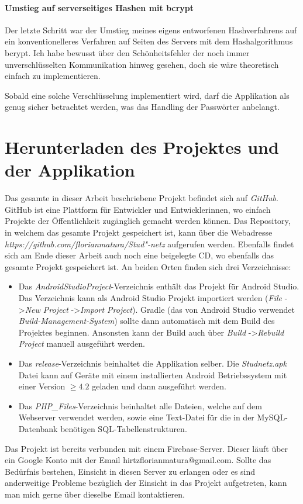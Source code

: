 \documentclass[../main.tex]{subfiles}
\begin{document}
	\paragraph{Umstieg auf serverseitiges Hashen mit bcrypt}
	Der letzte Schritt war der Umstieg meines eigens entworfenen Hashverfahrens auf ein konventionelleres Verfahren auf Seiten des Servers mit dem Hashalgorithmus bcrypt. Ich habe bewusst über den Schönheitsfehler der noch immer unverschlüsselten Kommunikation hinweg gesehen, doch sie wäre theoretisch einfach zu implementieren. 
	
	Sobald eine solche Verschlüsselung implementiert wird, darf die Applikation als genug sicher betrachtet werden, was das Handling der Passwörter anbelangt.
	
	\section{Herunterladen des Projektes und der Applikation} \label{github}

	Das gesamte in dieser Arbeit beschriebene Projekt befindet sich auf \emph{GitHub}. GitHub ist eine Plattform für Entwickler und Entwicklerinnen, wo einfach Projekte der Öffentlichkeit zugänglich gemacht werden können. Das Repository, in welchem das gesamte Projekt gespeichert ist, kann über die Webadresse \emph{https://github.com/florianmatura/Stud"-netz} aufgerufen werden. Ebenfalls findet sich am Ende dieser Arbeit auch noch eine beigelegte CD, wo ebenfalls das gesamte Projekt gespeichert ist. An beiden Orten finden sich drei Verzeichnisse:

	\begin{itemize}
		\item Das \emph{AndroidStudioProject}-Verzeichnis enthält das Projekt für Android Studio. Das Verzeichnis kann als Android Studio Projekt importiert werden (\emph{File} -\textgreater \emph{New Project} -\textgreater \emph{Import Project}). Gradle (das von Android Studio verwendet \emph{Build-Management-System}) sollte dann automatisch mit dem Build des Projektes beginnen. Ansonsten kann der Build auch über \emph{Build} -\textgreater \emph{Rebuild Project} manuell ausgeführt werden.
		\item Das \emph{release}-Verzeichnis beinhaltet die Applikation selber. Die \emph{Studnetz.apk} Datei kann auf Geräte mit einem installierten Android Betriebssystem mit einer Version $\ge4.2$ geladen und dann ausgeführt werden.
		\item Das \emph{PHP\_Files}-Verzeichnis beinhaltet alle Dateien, welche auf dem Webserver verwendet werden, sowie eine Text-Datei für die in der MySQL-Datenbank benötigen SQL-Tabellenstrukturen.
	\end{itemize}
	
	Das Projekt ist bereits verbunden mit einem Firebase-Server. Dieser läuft über ein Google Konto mit der Email hirtzflorianmatura@gmail.com. Sollte das Bedürfnis bestehen, Einsicht in diesen Server zu erlangen oder es sind anderweitige Probleme bezüglich der Einsicht in das Projekt aufgetreten, kann man mich gerne über dieselbe Email kontaktieren.
	
\end{document}
